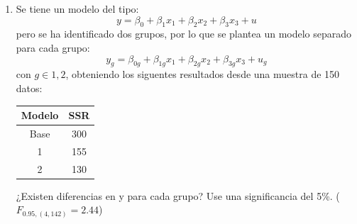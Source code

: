 \documentclass[10pt,a4paper]{article}
\begin{document}
\begin{enumerate}
\begin{itemize}
\item Modelos por grupo (no restringidos):
\[
Ventas_g = \beta_{0g} + \beta_{1g} ADV + \beta_{2g} PROD + \beta_{3g} CLI + u,\quad g\in\{\text{NORTE, CENTRO, SUR}\}.
\]

\item Datos: $n=50$, $G=3$. 
SSR restringido (base): $SSR_r=250$. 
SSR por grupos: $SSR_{\text{Norte}}=80$, $SSR_{\text{Centro}}=70$, $SSR_{\text{Sur}}=50$.
\[
SSR_{ur}=80+70+50=200.
\]

\item Estadístico de prueba:
\[
F=\frac{(SSR_r-SSR_{ur})/((G-1)(k+1))}{SSR_{ur}/(n-G(k+1))}
=\frac{(250-200)/( (3-1)(3+1))}{200/(50-3(3+1))}
=\frac{50/8}{200/38}
=\frac{6.25}{5.2632}\approx 1.19.
\]

\item Grados de libertad: 
\[
df_1=(G-1)(k+1)=(3-1)\cdot 4=8,\qquad 
df_2=n-G(k+1)=50-3\cdot 4=38.
\]

\item Regla de decisión (5\%): 
\[
F_{crítico}(0.95;8,38)=2.19.
\]
Como $F_{\text{obs}}=1.19<2.19$, \textbf{no se rechaza} $H_0$.

\item \textbf{Conclusión:} al 5\% de significancia no hay evidencia estadística de que los parámetros del modelo difieran entre las zonas NORTE, CENTRO y SUR; el modelo común (pooled) es adecuado.
\end{itemize}



\item Se tiene un modelo del tipo:
$$y = \beta_0 + \beta_1x_1 + \beta_2x_2+\beta_3x_3 + u$$
pero se ha identificado dos grupos, por lo que se plantea un modelo separado para cada grupo:
$$y_g = \beta_{0g} + \beta_{1g}x_1 + \beta_{2g}x_2+\beta_{3g}x_3 + u_g$$
con $g\in {1,2}$, obteniendo los siguentes resultados desde una muestra de 150 datos:
\begin{center}
    \begin{tabular}{|c|c|}
    \hline
        Modelo & SSR \\
        \hline
        Base & 300 \\
        \hline
        1 & 155 \\
        \hline
        2 & 130 \\
        \hline
    \end{tabular}
\end{center}
¿Existen diferencias en y para cada grupo? Use una significancia del 5\%. ($F_{0.95,(4,142)}=2.44$)


\end{enumerate}
\end{document}
